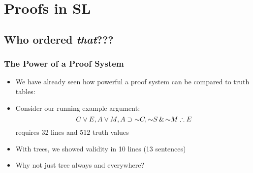 ﻿%

\setcounter{section}{5}

\section{Proofs in SL}

\begin{frame}

\scriptsize{\tableofcontents}

\end{frame}

\subsection{Who ordered \textit{that}???}

\begin{frame}
\frametitle{The Power of a Proof System}

\begin{itemize}[<+->]

\item We have already seen how powerful a proof system can be compared to truth tables:

\item Consider our running example argument: 
      \[
      C \eor E, A \eor M, A \eif \enot C, \enot S \eand \enot M \therefore E
      \]
      requires 32 lines and 512 truth values

\item With trees, we showed validity in 10 lines (13 sentences)

\item Why not just tree always and everywhere? 

\end{itemize}
\end{frame}

